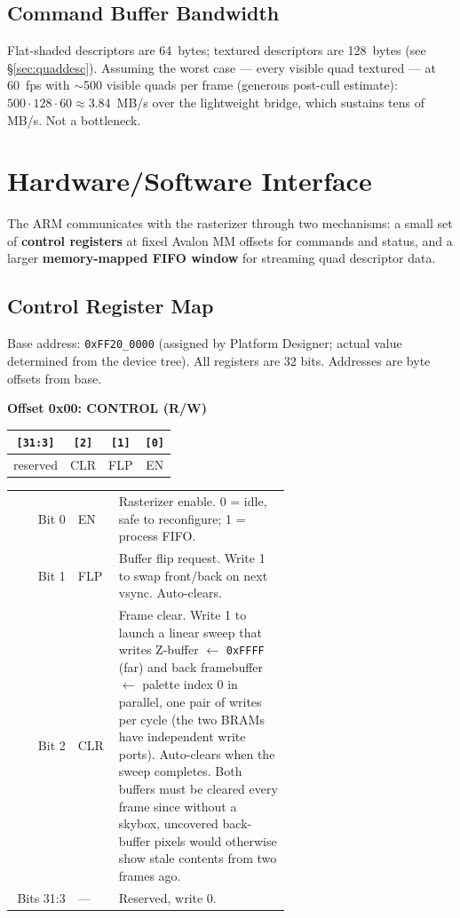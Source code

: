 \documentclass[11pt]{article}
\begin{document}
\subsection{Command Buffer Bandwidth}

Flat-shaded descriptors are 64~bytes; textured descriptors are 128~bytes (see \S\ref{sec:quaddesc}). Assuming the worst case --- every visible quad textured --- at 60~fps with $\sim$500 visible quads per frame (generous post-cull estimate): $500 \cdot 128 \cdot 60 \approx 3.84$~MB/s over the lightweight bridge, which sustains tens of MB/s. Not a bottleneck.

\section{Hardware/Software Interface}

The ARM communicates with the rasterizer through two mechanisms: a small set of \textbf{control registers} at fixed Avalon MM offsets for commands and status, and a larger \textbf{memory-mapped FIFO window} for streaming quad descriptor data.

\subsection{Control Register Map}

Base address: \texttt{0xFF20\_0000} (assigned by Platform Designer; actual value determined from the device tree). All registers are 32 bits. Addresses are byte offsets from base.

\vspace{0.5em}
\noindent\textbf{Offset 0x00: CONTROL (R/W)}
\vspace{0.3em}

\begin{center}
\begin{tabular}{|c|c|c|c|}
\hline
\texttt{[31:3]} & \texttt{[2]} & \texttt{[1]} & \texttt{[0]} \\
\hline
reserved & CLR & FLP & EN \\
\hline
\end{tabular}
\end{center}

\begin{tabular}{rlp{0.62\linewidth}}
Bit 0 & EN  & Rasterizer enable. 0 = idle, safe to reconfigure; 1 = process FIFO. \\
Bit 1 & FLP & Buffer flip request. Write 1 to swap front/back on next vsync. Auto-clears. \\
Bit 2 & CLR & Frame clear. Write 1 to launch a linear sweep that writes Z-buffer $\leftarrow$ \texttt{0xFFFF} (far) and back framebuffer $\leftarrow$ palette index 0 in parallel, one pair of writes per cycle (the two BRAMs have independent write ports). Auto-clears when the sweep completes. Both buffers must be cleared every frame since without a skybox, uncovered back-buffer pixels would otherwise show stale contents from two frames ago. \\
Bits 31:3 & --- & Reserved, write 0. \\
\end{tabular}
\end{document}
